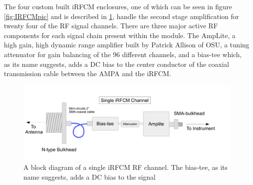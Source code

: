 	The four custom built iRFCM enclosures, one of which can be seen in figure \ref{fig:IRFCMpic} and is described in \ref{fig:IRFCM}, handle the second stage amplification for twenty four of the RF signal channels.  There are three major active RF components for each signal chain present within the module. The AmpLite, a high gain, high dynamic range amplifier built by Patrick Allison of OSU, a tuning attenuator for gain balancing of the 96 different channels, and a bias-tee which, as its name suggests, adds a DC bias to the center conductor of the coaxial transmission cable between the AMPA and the iRFCM.  

	
\begin{figure}
\centering
	\includegraphics[width=\textwidth]{figures/IRFCM}
	\caption{A block diagram of a single iRFCM RF channel.  The bias-tee, as its name suggests, adds a DC bias to the signal }
	\label{fig:IRFCM}
\end{figure}
	
